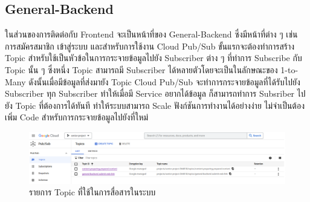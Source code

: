\documentclass[12pt,oneside,openright,a4paper]{cpe-thai-project}
\begin{document}
\begin{itemize}
\subsection{General-Backend}
  \hspace{1cm}ในส่วนของการติดต่อกับ Frontend จะเป็นหน้าที่ของ General-Backend ซึ่งมีหน้าที่ต่าง ๆ เช่น การสมัครสมาชิก เข้าสู่ระบบ 
  และสำหรับการใช้งาน Cloud Pub/Sub ขั้นแรกจะต้องทำการสร้าง Topic สำหรับใช้เป็นหัวข้อในการกระจายข้อมูลไปยัง Subscriber ต่าง ๆ ที่ทำการ Subscribe กับ Topic นั้น ๆ
  ซึ่งหนึ่ง Topic สามารถมี Subscriber ได้หลายตัวโดยจะเป็นในลักษณะของ 1-to-Many ดังนั้นเมื่อมีข้อมูลที่ส่งมายัง Topic Cloud Pub/Sub จะทำการกระจายข้อมูลที่ได้รับไปยัง 
  Subscriber ทุก Subscriber ทำให้เมื่อมี Service อยากได้ข้อมูล ก็สามารถทำการ Subsriber ไปยัง Topic ที่ต้องการได้ทันที 
  ทำให้ระบบสามารถ Scale ฟังก์ชันการทำงานได้อย่างง่าย ไม่จำเป็นต้องเพิ่ม Code สำหรับการกระจายข้อมูลไปยังที่ใหม่
  \begin{figure}[!ht]\centering
    \includegraphics[width=\textwidth]{./img/topic.png}
    \caption{รายการ Topic ที่ใช้ในการสื่อสารในระบบ}\label{fig:topic_list}
  \end{figure}


\end{itemize}
\end{document}
